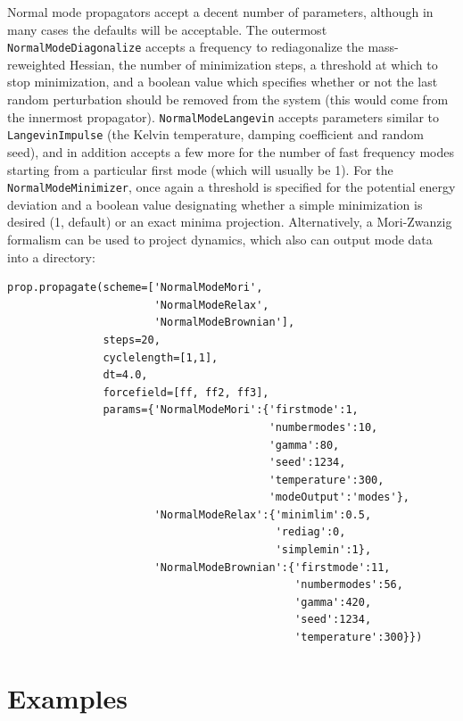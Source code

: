 \documentclass[11pt]{report}
\begin{document}
Normal mode propagators accept a decent number of parameters, although
in many cases the defaults will be acceptable.  The outermost \texttt{NormalModeDiagonalize}
accepts a frequency to rediagonalize the mass-reweighted Hessian, the number of
minimization steps, a threshold at which to stop minimization, and a boolean value
which specifies whether or not the last random perturbation should be removed from
the system (this would come from the innermost propagator).  \texttt{NormalModeLangevin}
accepts parameters similar to \texttt{LangevinImpulse} (the Kelvin temperature,
damping coefficient and random seed), and in addition accepts a few more for the
number of fast frequency modes starting from a particular first mode (which will usually
be 1).  For the \texttt{NormalModeMinimizer}, once again a threshold is specified for
the potential energy deviation and a boolean value designating whether a simple
minimization is desired (1, default) or an exact minima projection.  Alternatively,
a Mori-Zwanzig \cite{} formalism can be used to project dynamics, which also
can output mode data into a directory:


\begin{verbatim}
prop.propagate(scheme=['NormalModeMori', 
                       'NormalModeRelax', 
                       'NormalModeBrownian'],
               steps=20,
               cyclelength=[1,1],
               dt=4.0,
               forcefield=[ff, ff2, ff3],
               params={'NormalModeMori':{'firstmode':1,
                                         'numbermodes':10,
                                         'gamma':80,
                                         'seed':1234,
                                         'temperature':300,
                                         'modeOutput':'modes'},
                       'NormalModeRelax':{'minimlim':0.5,
                                          'rediag':0,
                                          'simplemin':1},
                       'NormalModeBrownian':{'firstmode':11,
                                             'numbermodes':56,
                                             'gamma':420,
                                             'seed':1234,
                                             'temperature':300}})
\end{verbatim}

\newpage
\section{Examples}
\end{document}
